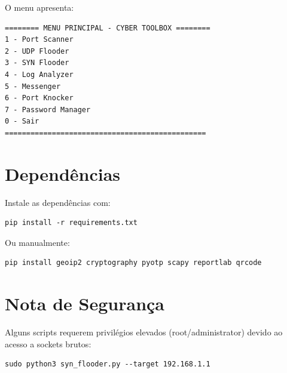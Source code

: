 \documentclass[11pt,a4paper]{article}
\begin{document}
O menu apresenta:
\begin{lstlisting}[style=bash]
======== MENU PRINCIPAL - CYBER TOOLBOX ========
1 - Port Scanner
2 - UDP Flooder
3 - SYN Flooder
4 - Log Analyzer
5 - Messenger
6 - Port Knocker
7 - Password Manager
0 - Sair
===============================================
\end{lstlisting}

\section{Depend\^encias}
Instale as depend\^encias com:
\begin{lstlisting}[style=bash]
pip install -r requirements.txt
\end{lstlisting}

Ou manualmente:
\begin{lstlisting}[style=bash]
pip install geoip2 cryptography pyotp scapy reportlab qrcode
\end{lstlisting}

\section{Nota de Seguran\c{c}a}
Alguns scripts requerem privil\'egios elevados (root/administrator) devido ao acesso a sockets brutos:
\begin{lstlisting}[style=bash]
sudo python3 syn_flooder.py --target 192.168.1.1
\end{lstlisting}
\end{document}
